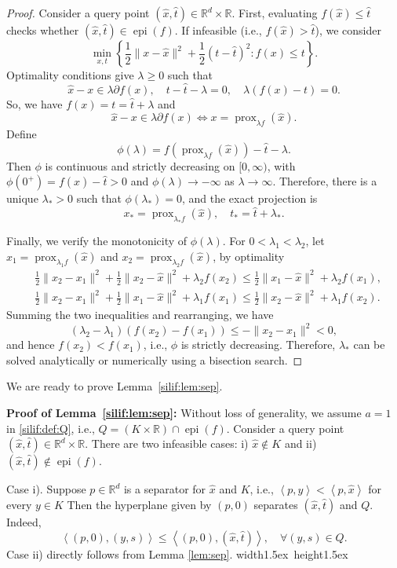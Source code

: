 \documentclass[11pt,letterpaper]{article}
\newcommand{\R}{\mathbb{R}}
\newcommand{\prox}{\operatorname{prox}}
\newcommand{\epi}{\operatorname{epi}}
\newcommand{\lam}{\lambda}
\newcommand{\inner}[2]{\left\langle #1  ,#2 \right\rangle}
\newcommand*{\QEDA}{\hfill\hbox{\vrule width1.5ex height1.5ex}}
\begin{document}
\begin{proof}
    Consider a query point $(\hat x,\hat t) \in \R^d \times \R$. First, evaluating $f(\hat x)\le \hat t$ checks whether $(\hat x,\hat t)\in \epi(f)$. If infeasible (i.e., $f(\hat x) > \hat t$), we consider
    \[
    \min_{x, t} \left\{\frac{1}{2}\|x-\hat x\|^2+\frac{1}{2}(t-\hat t)^2: f(x) \le t\right\}.
    \]
    Optimality conditions give $\lambda \geq 0$ such that
    \[
        \hat x-x \in \lam \partial f(x), \quad t-\hat t - \lam =0, \quad \lam (f(x) - t) = 0.
    \]
    So, we have $f(x) = t= \hat t + \lam$ and
    \[
    \hat x-x \in \lam \partial f(x) \Longleftrightarrow x=\prox_{\lam f}(\hat x).
    \]
    Define 
    \[
    \phi(\lam) = f(\prox_{\lam f}(\hat x)) -\hat t - \lam.
    \]
    Then $\phi$ is continuous and strictly decreasing on $[0, \infty)$, with $\phi(0^{+})=f(\hat x)-\hat t>0$ and $\phi(\lam) \rightarrow-\infty$ as $\lambda \rightarrow \infty$.
    Therefore, there is a unique $\lam_*>0$ such that $\phi(\lam_*)=0$, and the exact projection is
    \[
    x_* = \prox_{\lam_* f}(\hat x), \quad t_* = \hat t + \lam_*.
    \]

    Finally, we verify the monotonicity of $\phi(\lam)$. For $0< \lam_1 < \lam_2$, let $x_1= \prox_{\lam_1 f}(\hat x)$ and $x_2=\prox_{\lam_2 f}(\hat x)$, by optimality
    \begin{align*} 
    & \frac{1}{2}\|x_2-x_1\|^2 + \frac{1}{2}\|x_2-\hat x\|^2+\lam_2 f(x_2) \le \frac{1}{2}\|x_1-\hat x\|^2+\lam_2 f(x_1), \\ 
    & \frac{1}{2}\|x_2-x_1\|^2 + \frac{1}{2}\|x_1-\hat x\|^2+\lam_1 f(x_1) \le \frac{1}{2}\|x_2-\hat x\|^2+\lam_1 f(x_2) .
    \end{align*}
    Summing the two inequalities and rearranging, we have
    \[
    (\lambda_2-\lambda_1)(f(x_2)-f(x_1)) \le -\|x_2-x_1\|^2 <0 ,
    \]
    and hence $f(x_2)<f(x_1)$, i.e., $\phi$ is strictly decreasing. Therefore, $\lam_*$ can be solved analytically or numerically using a bisection search.
\end{proof}

We are ready to prove Lemma~\ref{silif:lem:sep}.

\noindent
\textbf{Proof of Lemma~\ref{silif:lem:sep}:} 
Without loss of generality, we assume $a=1$ in \eqref{silif:def:Q}, i.e., $Q= (K \times \R) \cap \epi(f)$. Consider a query point $(\hat x,\hat t) \in \R^d \times \R$. There are two infeasible cases: i) $\hat x \notin K$ and ii) $(\hat x, \hat t)\notin \epi(f)$. 

    Case i). Suppose $p\in \R^d$ is a separator for $\hat x$ and $K$, i.e., $\inner{p}{y} < \inner{p}{\hat x}$ for every $y \in K$ 
    Then the hyperplane given by $(p,0)$ separates $(\hat x,\hat t)$ and $Q$. Indeed,
    \[
    \inner{(p,0)}{(y,s)} \le \inner{(p,0)}{(\hat x,\hat t)}, \quad \forall (y,s) \in Q. 
    \]
    Case ii) directly follows from Lemma \ref{lem:sep}.
\QEDA
\end{document}
